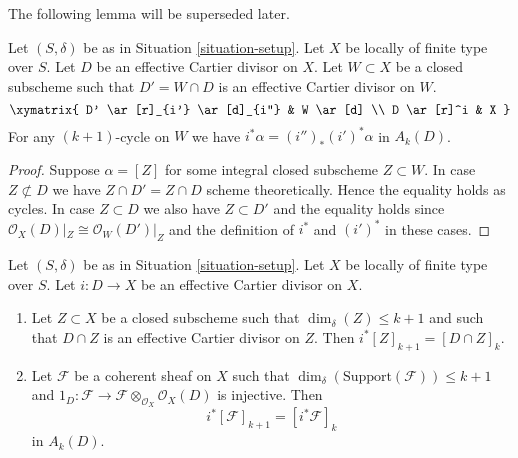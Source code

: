 \noindent
The following lemma will be superseded later.

\begin{lemma}
\label{lemma-closed-in-X-gysin}
Let $(S, \delta)$ be as in Situation \ref{situation-setup}.
Let $X$ be locally of finite type over $S$.
Let $D$ be an effective Cartier divisor on $X$.
Let $W \subset X$ be a closed subscheme such that
$D' = W \cap D$ is an effective Cartier divisor on $W$.
$$
\xymatrix{
D' \ar[r]_{i'} \ar[d]_{i''} & W \ar[d] \\
D \ar[r]^i & X
}
$$
For any $(k + 1)$-cycle on $W$ we have
$i^*\alpha = (i'')_*(i')^*\alpha$ in $A_k(D)$.
\end{lemma}

\begin{proof}
Suppose $\alpha = [Z]$ for some integral closed subscheme
$Z \subset W$. In case $Z \not \subset D$ we have
$Z \cap D' = Z \cap D$ scheme theoretically. Hence the
equality holds as cycles. In case $Z \subset D$ we also
have $Z \subset D'$ and the equality holds since
$\mathcal{O}_X(D)|_Z \cong \mathcal{O}_W(D')|_Z$
and the definition of $i^*$ and $(i')^*$ in these cases.
\end{proof}

\begin{lemma}
\label{lemma-easy-gysin}
Let $(S, \delta)$ be as in Situation \ref{situation-setup}.
Let $X$ be locally of finite type over $S$.
Let $i : D \to X$ be an effective Cartier divisor on $X$.
\begin{enumerate}
\item Let $Z \subset X$ be a closed subscheme such
that $\dim_\delta(Z) \leq k + 1$ and such that
$D \cap Z$ is an effective Cartier divisor on $Z$. Then
$i^*[Z]_{k + 1} = [D \cap Z]_k$.
\item Let $\mathcal{F}$ be a coherent sheaf on $X$
such that $\dim_\delta(\text{Support}(\mathcal{F})) \leq k + 1$ and
$1_D : \mathcal{F} \to \mathcal{F} \otimes_{\mathcal{O}_X} \mathcal{O}_X(D)$
is injective. Then
$$
i^*[\mathcal{F}]_{k + 1} = [i^*\mathcal{F}]_k
$$
in $A_k(D)$.
\end{enumerate}
\end{lemma}

